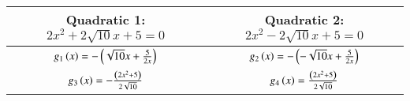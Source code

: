 \begin{tabular}{|c|c|}
\hline
    \textbf{Quadratic 1:} $2x^2 + 2\sqrt{10} x + 5 = 0$ & \textbf{Quadratic 2:} $2x^2 - 2\sqrt{10} x + 5 = 0$\\
\hline
    $g_1\left(x\right) = -\left(\sqrt{10}x + \frac{5}{2x}\right)$ & $g_2\left(x\right) = -\left(-\sqrt{10}x + \frac{5}{2x}\right)$ \\
\hline
    $g_3\left(x\right) = -\frac{\left(2x^2 + 5\right)}{2\sqrt{10}}$ & $g_4\left(x\right) = \frac{\left(2x^2 + 5\right)}{2\sqrt{10}}$ \\
\hline
\end{tabular}
